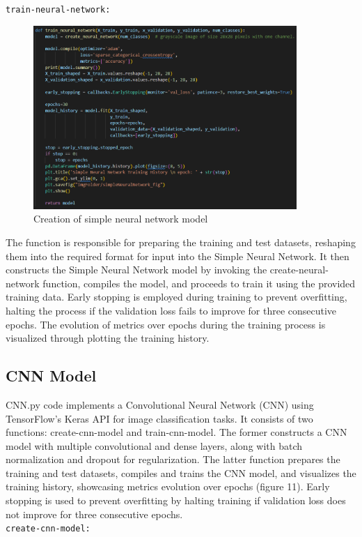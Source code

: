 \documentclass{article}
\newcommand{\code}[1]{\colorbox{light-gray}{\texttt{#1}}}
\begin{document}
\code{train-neural-network:}
\\\newline
\begin{figure}[H]
    \caption{Creation of simple neural network model}
    \centering
    \includegraphics[width=10cm]{../imgFolder/train_neural_network-code.png}
\end{figure}
The function is responsible for preparing the training and test datasets, reshaping them into the required format for input into the Simple Neural Network. It then constructs the Simple Neural Network model by invoking the create-neural-network function, compiles the model, and proceeds to train it using the provided training data. Early stopping is employed during training to prevent overfitting, halting the process if the validation loss fails to improve for three consecutive epochs. The evolution of metrics over epochs during the training process is visualized through plotting the training history.
\newpage

\subsection{CNN Model}
CNN.py code implements a Convolutional Neural Network (CNN) using TensorFlow's Keras API for image classification tasks. It consists of two functions: create-cnn-model and train-cnn-model. The former constructs a CNN model with multiple convolutional and dense layers, along with batch normalization and dropout for regularization. The latter function prepares the training and test datasets, compiles and trains the CNN model, and visualizes the training history, showcasing metrics evolution over epochs (figure 11). Early stopping is used to prevent overfitting by halting training if validation loss does not improve for three consecutive epochs.\\\newline
\code{create-cnn-model:}
\end{document}
